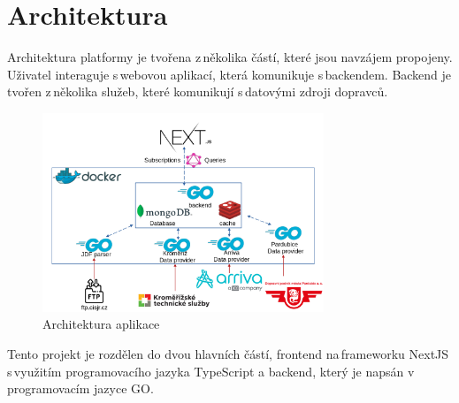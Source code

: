 \section{Architektura}
Architektura platformy je tvořena z\,několika částí, které jsou navzájem propojeny. Uživatel interaguje s\,webovou aplikací, která komunikuje s\,backendem. Backend je tvořen z\,několika služeb, které komunikují s\,datovými zdroji dopravců.
\par
\begin{figure}[H]
    \centering
    \includegraphics[width=0.75\textwidth]{images/architekturaV5.png}
    \caption{Architektura aplikace}
    \label{architektura}
\end{figure}
\par
Tento projekt je rozdělen do dvou hlavních částí, frontend na\,frameworku NextJS s\,využitím programovacího jazyka TypeScript a backend, který je napsán v\,programovacím jazyce GO.